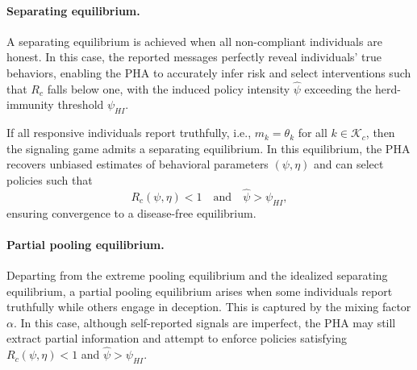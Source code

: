 \documentclass[sigconf,review]{acmart}
\begin{document}

\paragraph{Separating equilibrium.}
A separating equilibrium \cite{BergstromRS2002} is achieved when all non-compliant individuals are honest. In this case, the reported messages perfectly reveal individuals’ true behaviors, enabling the PHA to accurately infer risk and select interventions such that $R_c$ falls below one, with the induced policy intensity $\widehat{\psi}$ exceeding the herd-immunity threshold $\psi_{HI}$.

\begin{theorem}
\label{thm:separating}
If all responsive individuals report truthfully, i.e., $m_k = \theta_k$ for all $k\in\mathcal{K}_c$, then the signaling game admits a separating equilibrium. In this equilibrium, the PHA recovers unbiased estimates of behavioral parameters $(\psi,\eta)$ and can select policies such that
\[
R_c(\psi,\eta) < 1 \quad \text{and} \quad \widehat{\psi} > \psi_{HI},
\]
ensuring convergence to a disease-free equilibrium.
\end{theorem}


\paragraph{Partial pooling equilibrium.}
Departing from the extreme pooling equilibrium and the idealized separating equilibrium, a partial pooling equilibrium arises when some individuals report truthfully while others engage in deception. This is captured by the mixing factor $\alpha$. In this case, although self-reported signals are imperfect, the PHA may still extract partial information and attempt to enforce policies satisfying $R_c(\psi,\eta) < 1$ and $\widehat{\psi} > \psi_{HI}$.
\end{document}

